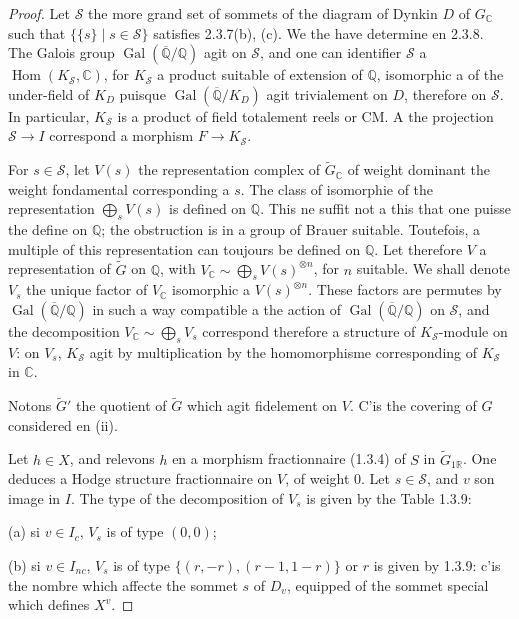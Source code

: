 \documentclass[12pt,a4paper]{article}
\theoremstyle{plain}
\theoremstyle{definition}
\theoremstyle{remark}
\DeclareMathOperator{\Hom}{Hom}
\DeclareMathOperator{\Gal}{Gal}
\newcommand{\QQ}{\mathbb{Q}}
\newcommand{\RR}{\mathbb{R}}
\newcommand{\CC}{\mathbb{C}}
\begin{document}
\begin{proof}
Let $\mathcal{S}$ the more grand set of sommets of the diagram of Dynkin $D$ of $G_{\CC}$ such that $\{\{s\} \mid s \in \mathcal{S}\}$ satisfies 2.3.7(b), (c). We the have determine en 2.3.8. The Galois group $\Gal(\overline{\QQ}/\QQ)$ agit on $\mathcal{S}$, and one can identifier $\mathcal{S}$ a $\Hom(K_\mathcal{S},\CC)$, for $K_\mathcal{S}$ a product suitable of extension of $\QQ$, isomorphic a of the under-field of $K_D$ puisque $\Gal(\overline{\QQ}/K_D)$ agit trivialement on $D$, therefore on $\mathcal{S}$. In particular, $K_\mathcal{S}$ is a product of field totalement reels or CM. A the projection $\mathcal{S} \to I$ correspond a morphism $F \to K_\mathcal{S}$.

For $s \in \mathcal{S}$, let $V(s)$ the representation complex of $\tilde{G}_{\CC}$ of weight dominant the weight fondamental corresponding a $s$. The class of isomorphie of the representation $\bigoplus_s V(s)$ is defined on $\QQ$. This ne suffit not a this that one puisse the define on $\QQ$; the obstruction is in a group of Brauer suitable. Toutefois, a multiple of this representation can toujours be defined on $\QQ$. Let therefore $V$ a representation of $\tilde{G}$ on $\QQ$, with $V_{\CC} \sim \bigoplus_s V(s)^{\otimes n}$, for $n$ suitable. We shall denote $V_s$ the unique factor of $V_{\CC}$ isomorphic a $V(s)^{\otimes n}$. These factors are permutes by $\Gal(\overline{\QQ}/\QQ)$ in such a way compatible a the action of $\Gal(\overline{\QQ}/\QQ)$ on $\mathcal{S}$, and the decomposition $V_{\CC} \sim \bigoplus_s V_s$ correspond therefore a structure of $K_\mathcal{S}$-module on $V$: on $V_s$, $K_\mathcal{S}$ agit by multiplication by the homomorphisme corresponding of $K_\mathcal{S}$ in $\CC$.

Notons $\tilde{G}'$ the quotient of $\tilde{G}$ which agit fidelement on $V$. C'is the covering of $G$ considered en (ii).

Let $h \in X$, and relevons $h$ en a morphism fractionnaire (1.3.4) of $S$ in $\tilde{G}_{1\RR}$. One deduces a Hodge structure fractionnaire on $V$, of weight 0. Let $s \in \mathcal{S}$, and $v$ son image in $I$. The type of the decomposition of $V_s$ is given by the Table 1.3.9:

(a) si $v \in I_c$, $V_s$ is of type $(0,0)$;

(b) si $v \in I_{nc}$, $V_s$ is of type $\{(r,-r), (r-1,1-r)\}$ or $r$ is given by 1.3.9: c'is the nombre which affecte the sommet $s$ of $D_v$, equipped of the sommet special which defines $X^v$.


\end{proof}
\end{document}
